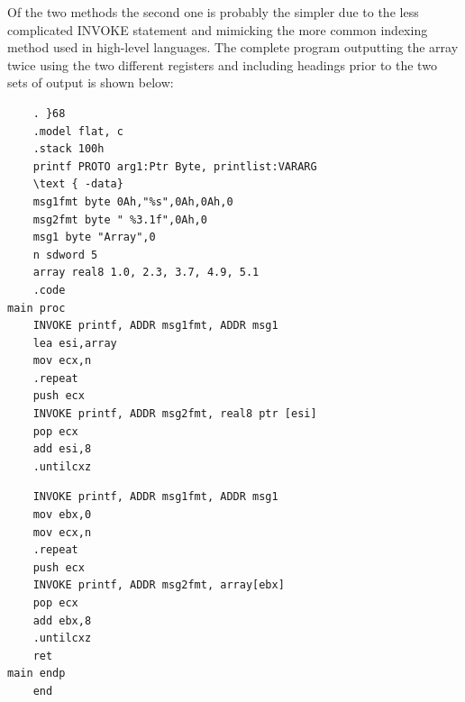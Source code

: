 \documentclass[10pt]{book}
\begin{document}
Of the two methods the second one is probably the simpler due to the less complicated INVOKE statement and mimicking the more common indexing method used in high-level languages. The complete program outputting the array twice using the two different registers and including headings prior to the two sets of output is shown below:

\begin{verbatim}
    . }68
    .model flat, c
    .stack 100h
    printf PROTO arg1:Ptr Byte, printlist:VARARG
    \text { -data}
    msg1fmt byte 0Ah,"%s",0Ah,0Ah,0
    msg2fmt byte " %3.1f",0Ah,0
    msg1 byte "Array",0
    n sdword 5
    array real8 1.0, 2.3, 3.7, 4.9, 5.1
    .code
main proc
    INVOKE printf, ADDR msg1fmt, ADDR msg1
    lea esi,array
    mov ecx,n
    .repeat
    push ecx
    INVOKE printf, ADDR msg2fmt, real8 ptr [esi]
    pop ecx
    add esi,8
    .untilcxz
\end{verbatim}

\begin{verbatim}
    INVOKE printf, ADDR msg1fmt, ADDR msg1
    mov ebx,0
    mov ecx,n
    .repeat
    push ecx
    INVOKE printf, ADDR msg2fmt, array[ebx]
    pop ecx
    add ebx,8
    .untilcxz
    ret
main endp
    end
\end{verbatim}
\end{document}
